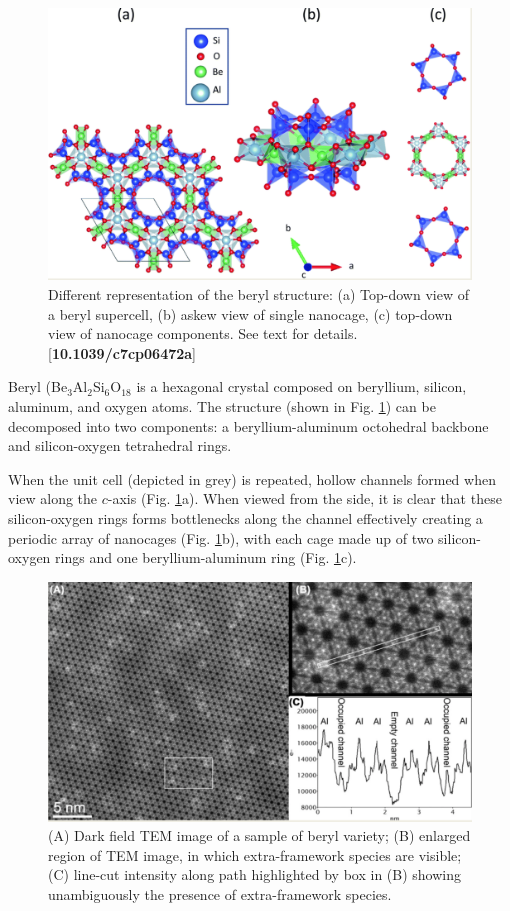         \begin{figure}
            \centering
            \includegraphics[width=0.9\linewidth]{Figures/System/beryl_structure.png}
            \caption{Different representation of the beryl structure: (a) Top-down view of a beryl supercell, (b) askew view of single nanocage, (c) top-down view of nanocage components. See text for details. [\textbf{10.1039/c7cp06472a}]}
            \label{fig:beryl_structure}
        \end{figure}
        
        Beryl (Be$_3$Al$_2$Si$_6$O$_18$ is a hexagonal crystal composed on beryllium, silicon, aluminum, and oxygen atoms. The structure (shown in Fig. \ref{fig:beryl_structure}) can be decomposed into two components: a beryllium-aluminum octohedral backbone and silicon-oxygen tetrahedral rings. 
        
        When the unit cell (depicted in grey) is repeated, hollow channels formed when view along the $c$-axis (Fig. \ref{fig:beryl_structure}a). When viewed from the side, it is clear that these silicon-oxygen rings forms bottlenecks along the channel effectively creating a periodic array of nanocages (Fig. \ref{fig:beryl_structure}b), with each cage made up of two silicon-oxygen rings and one beryllium-aluminum ring (Fig. \ref{fig:beryl_structure}c).
        
        \begin{figure}
            \centering
            \includegraphics[width=0.9\linewidth]{Figures/System/beryl_tem.png}
            \caption{(A) Dark field TEM image of a sample of beryl variety; (B) enlarged region of TEM image, in which extra-framework species are visible; (C) line-cut intensity along path highlighted by box in (B) showing unambiguously the presence of extra-framework species.}
            \label{fig:beryl_tem}
        \end{figure}
        
